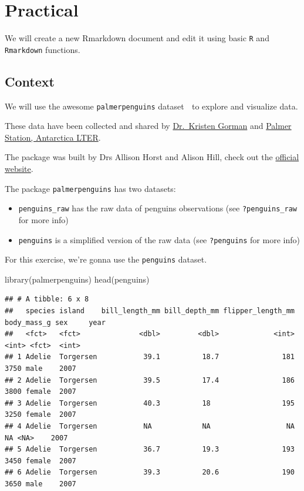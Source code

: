 \documentclass[
  12pt,
]{book}
\newenvironment{Shaded}{\begin{snugshade}}{\end{snugshade}}
\newcommand{\FunctionTok}[1]{\textcolor[rgb]{0.00,0.00,0.00}{#1}}
\newcommand{\NormalTok}[1]{#1}
\providecommand{\tightlist}{%
  \setlength{\itemsep}{0pt}\setlength{\parskip}{0pt}}
\begin{document}
\hypertarget{practical}{%
\section{Practical}\label{practical}}

We will create a new Rmarkdown document and edit it using basic \texttt{R} and \texttt{Rmarkdown} functions.

\hypertarget{context}{%
\subsection{Context}\label{context}}

We will use the awesome \texttt{palmerpenguins} dataset 🐧 to explore and visualize data.

These data have been collected and shared by \href{https://www.uaf.edu/cfos/people/faculty/detail/kristen-gorman.php}{Dr.~Kristen Gorman} and \href{https://pal.lternet.edu/}{Palmer Station, Antarctica LTER}.

The package was built by Drs Allison Horst and Alison Hill, check out the \href{https://allisonhorst.github.io/palmerpenguins/}{official website}.

The package \texttt{palmerpenguins} has two datasets:

\begin{itemize}
\tightlist
\item
  \texttt{penguins\_raw} has the raw data of penguins observations (see \texttt{?penguins\_raw} for more info)
\item
  \texttt{penguins} is a simplified version of the raw data (see \texttt{?penguins} for more info)
\end{itemize}

For this exercise, we're gonna use the \texttt{penguins} dataset.

\begin{Shaded}
\begin{Highlighting}[]
\FunctionTok{library}\NormalTok{(palmerpenguins)}
\FunctionTok{head}\NormalTok{(penguins)}
\end{Highlighting}
\end{Shaded}

\begin{verbatim}
## # A tibble: 6 x 8
##   species island    bill_length_mm bill_depth_mm flipper_length_mm body_mass_g sex     year
##   <fct>   <fct>              <dbl>         <dbl>             <int>       <int> <fct>  <int>
## 1 Adelie  Torgersen           39.1          18.7               181        3750 male    2007
## 2 Adelie  Torgersen           39.5          17.4               186        3800 female  2007
## 3 Adelie  Torgersen           40.3          18                 195        3250 female  2007
## 4 Adelie  Torgersen           NA            NA                  NA          NA <NA>    2007
## 5 Adelie  Torgersen           36.7          19.3               193        3450 female  2007
## 6 Adelie  Torgersen           39.3          20.6               190        3650 male    2007
\end{verbatim}
\end{document}
